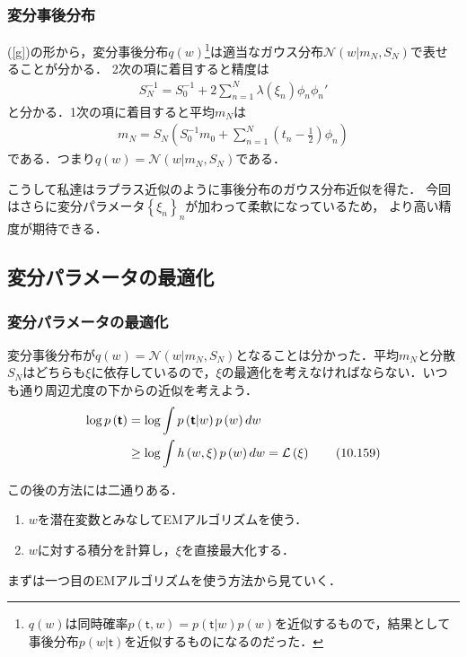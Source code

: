\documentclass[10pt,hyperref={unicode}]{beamer}
\newcommand{\paref}[1]{{\fontfamily{cmr}\selectfont (\ref{#1})}}
\newcommand{\parentheses}[1]{\left(#1\right)}
\newcommand{\braces}[1]{\left\{#1\right\}}
\newcommand{\energy}{\mathcal{L}}
\begin{document}
\begin{frame}
\frametitle{変分事後分布}
\paref{g}の形から，変分事後分布$q\parentheses{w}$\footnote[frame]{$q\parentheses{w}$は同時確率$p\parentheses{\bm{\mathsf{t}},w} = p\parentheses{\bm{\mathsf{t}}|w}p\parentheses{w}$を近似するもので，結果として事後分布$p\parentheses{w|\bm{\mathsf{t}}}$を近似するものになるのだった．}は適当なガウス分布$\mathcal{N}\parentheses{w|m_N,S_N}$で表せることが分かる．
2次の項に着目すると精度は
\begin{align*}
    S_N^{-1} = S_0^{-1} + 2 \sum_{n = 1}^N \lambda\parentheses{\xi_n} \phi_n \phi_n'
\end{align*}
と分かる．1次の項に着目すると平均$m_N$は
\begin{align*}
    m_N = S_N\parentheses{S_0^{-1}m_0 + \sum_{n = 1}^N \parentheses{t_n - \frac{1}{2}}\phi_n}
\end{align*}
である．つまり$q\parentheses{w} = \mathcal{N}\parentheses{w|m_N,S_N}$である．

\bigskip

こうして私達はラプラス近似のように事後分布のガウス分布近似を得た．
今回はさらに変分パラメータ$\braces{\xi_n}_n$が加わって柔軟になっているため，
より高い精度が期待できる．
\end{frame}

\subsection{変分パラメータの最適化}
\begin{frame}
\frametitle{変分パラメータの最適化}
変分事後分布が$q\parentheses{w} = \mathcal{N}\parentheses{w|m_N,S_N}$となることは分かった．平均$m_N$と分散$S_N$はどちらも$\xi$に依存しているので，$\xi$の最適化を考えなければならない．いつも通り周辺尤度の下からの近似を考えよう．
\begin{align}
    \log p\parentheses{\bm{\mathsf{t}}}
    &= \log \int p\parentheses{\bm{\mathsf{t}}|w}p\parentheses{w}dw \notag \\
    &\geq \log \int h\parentheses{w,\xi}p\parentheses{w}dw = \energy\parentheses{\xi} \tag{10.159}
\end{align}

\bigskip

この後の方法には二通りある．
\begin{enumerate}
    \item $w$を潜在変数とみなしてEMアルゴリズムを使う．
    \item $w$に対する積分を計算し，$\xi$を直接最大化する．
\end{enumerate}

\bigskip

まずは一つ目のEMアルゴリズムを使う方法から見ていく．
\end{frame}
\end{document}
